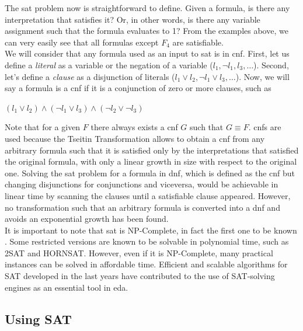 The \gls{sat} problem now is straightforward to define. Given a formula, is there any interpretation that satisfies it? Or, in other words, is there any variable assignment such that the formula evaluates to 1? From the examples above, we can very easily see that all formulas except $F_{4}$ are satisfiable. \\

We will consider that any formula used as an input to \gls{sat} is in \gls{cnf}. First, let us define a \textit{literal} as a variable or the negation of a variable ($l_{1}, \neg l_{1}, l_{3}, \ldots$). Second,  let's define a \textit{clause} as a disjunction of literals ($l_{1} \lor l_{2}, \neg l_{1} \lor l_{3}, \ldots$). Now, we will say a formula is a \gls{cnf} if it is a conjunction of zero or more clauses, such as

\begin{center}$(l_{1} \lor l_{2}) \wedge (\neg l_{1} \lor l_{3}) \wedge (\neg l_{2} \lor \neg l_{3})$\end{center} 

Note that for a given $F$ there always exists a \gls{cnf} $G$ such that $G \equiv F$. \glspl{cnf} are used because the Tseitin Transformation \cite{tseitin} allows to obtain a \gls{cnf} from any arbitrary formula such that it is satisfied only by the interpretations that satisfied the original formula, with only a linear growth in size with respect to the original one. Solving the \gls{sat} problem for a formula in \gls{dnf}, which is defined as the \gls{cnf} but changing disjunctions for conjunctions and viceversa, would be achievable in linear time by scanning the clauses until a satisfiable clause appeared. However, no transformation such that an arbitrary formula is converted into a \gls{dnf} and avoids an exponential growth has been found. \\

It is important to note that \gls{sat} is NP-Complete, in fact the first one to be known \cite{cook}. Some restricted versions are known to be solvable in polynomial time, such as 2SAT and HORNSAT. However, even if it is NP-Complete, many practical instances can be solved in affordable time. Efficient and scalable algorithms for SAT developed in the last years have contributed to the use of SAT-solving engines as an essential tool in \gls{eda}.


\subsection{Using SAT}

